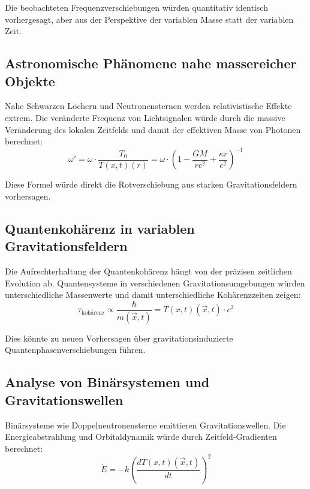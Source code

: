 \documentclass[12pt,a4paper]{article}
\newcommand{\Tfieldt}{T(x,t)}
\newcommand{\vecx}{\vec{x}}
\begin{document}
	Die beobachteten Frequenzverschiebungen würden quantitativ identisch vorhergesagt, aber aus der Perspektive der variablen Masse statt der variablen Zeit.
	
	\subsection{Astronomische Phänomene nahe massereicher Objekte}
	\label{subsec:massive_objects}
	
	Nahe Schwarzen Löchern und Neutronensternen werden relativistische Effekte extrem. Die veränderte Frequenz von Lichtsignalen würde durch die massive Veränderung des lokalen Zeitfelds und damit der effektiven Masse von Photonen berechnet:
	\begin{equation}
		\omega' = \omega \cdot \frac{T_0}{\Tfieldt(r)} = \omega \cdot \left(1-\frac{GM}{rc^2} + \frac{\kappa r}{c^2}\right)^{-1}
	\end{equation}
	
	Diese Formel würde direkt die Rotverschiebung aus starken Gravitationsfeldern vorhersagen.
	
	\subsection{Quantenkohärenz in variablen Gravitationsfeldern}
	\label{subsec:quantum_coherence}
	
	Die Aufrechterhaltung der Quantenkohärenz hängt von der präzisen zeitlichen Evolution ab. Quantensysteme in verschiedenen Gravitationsumgebungen würden unterschiedliche Massenwerte und damit unterschiedliche Kohärenzzeiten zeigen:
	\begin{equation}
		\tau_{\text{kohärenz}} \propto \frac{\hbar}{m(\vecx,t)} = \Tfieldt(\vecx,t) \cdot c^2
	\end{equation}
	
	Dies könnte zu neuen Vorhersagen über gravitationsinduzierte Quantenphasenverschiebungen führen.
	
	\subsection{Analyse von Binärsystemen und Gravitationswellen}
	\label{subsec:binary_systems}
	
	Binärsysteme wie Doppelneutronensterne emittieren Gravitationswellen. Die Energieabstrahlung und Orbitaldynamik würde durch Zeitfeld-Gradienten berechnet:
	\begin{equation}
		\dot{E} = -k \left(\frac{d\Tfieldt(\vecx,t)}{dt}\right)^2
	\end{equation}
	
\end{document}

